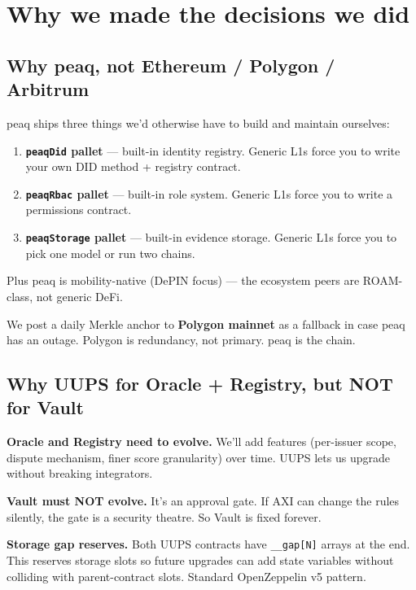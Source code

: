 \documentclass[11pt,a4paper]{article}
\begin{document}
\newpage
\section{Why we made the decisions we did}

\subsection{Why peaq, not Ethereum / Polygon / Arbitrum}

peaq ships three things we'd otherwise have to build and maintain ourselves:

\begin{enumerate}[leftmargin=*, nosep]
  \item \textbf{\texttt{peaqDid} pallet} --- built-in identity registry. Generic L1s force you to write your own DID method + registry contract.
  \item \textbf{\texttt{peaqRbac} pallet} --- built-in role system. Generic L1s force you to write a permissions contract.
  \item \textbf{\texttt{peaqStorage} pallet} --- built-in evidence storage. Generic L1s force you to pick one model or run two chains.
\end{enumerate}

Plus peaq is mobility-native (DePIN focus) --- the ecosystem peers are ROAM-class, not generic DeFi.

We post a daily Merkle anchor to \textbf{Polygon mainnet} as a fallback in case peaq has an outage. Polygon is redundancy, not primary. peaq is the chain.

\subsection{Why UUPS for Oracle + Registry, but NOT for Vault}

\textbf{Oracle and Registry need to evolve.} We'll add features (per-issuer scope, dispute mechanism, finer score granularity) over time. UUPS lets us upgrade without breaking integrators.

\textbf{Vault must NOT evolve.} It's an approval gate. If AXI can change the rules silently, the gate is a security theatre. So Vault is fixed forever.

\textbf{Storage gap reserves.} Both UUPS contracts have \texttt{\_\_gap[N]} arrays at the end. This reserves storage slots so future upgrades can add state variables without colliding with parent-contract slots. Standard OpenZeppelin v5 pattern.
\end{document}
